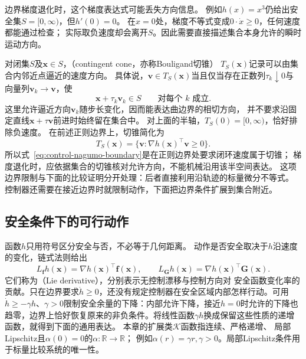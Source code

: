 边界梯度退化时，这个梯度表达式可能丢失方向信息。
例如$h(x)=x^3$仍给出安全集$S=[0,\infty)$，但$h'(0)=0$。
在$x=0$处，梯度不等式变成$0\cdot\dot x\geq0$，任何速度都能通过检查；
实际取负速度却会离开$S$。因此需要直接描述集合本身允许的瞬时运动方向。

对闭集$S$及$\bm x\in S$，（contingent cone，亦称Bouligand切锥）
$T_S(\bm x)$记录可以由集合内邻近点逼近的速度方向。
具体说，$\bm v\in T_S(\bm x)$当且仅当存在正数列$\tau_k\downarrow0$与
向量列$\bm v_k\to\bm v$，使
\[
  \bm x+\tau_k\bm v_k\in S\qquad\text{对每个 }k\text{ 成立}.
\]
这里允许逼近方向$\bm v_k$随步长变化，因而能表达曲边界的相切方向，
并不要求沿固定直线$\bm x+\tau\bm v$前进时始终留在集合中。
对上面的半轴，$T_S(0)=[0,\infty)$，恰好排除负速度。
在前述正则边界上，切锥简化为
\[
  T_S(\bm x)=\{\bm v:\nabla h(\bm x)^\top\bm v\geq0\}.
\]
所以式~\eqref{eq:control-nagumo-boundary}是在正则边界处要求闭环速度属于切锥；
梯度退化时，应依据集合的切锥核对允许方向，不能机械沿用该半空间表达。
这项边界限制与下面的比较证明分开处理：后者直接利用沿轨迹的标量微分不等式。
控制器还需要在接近边界时就限制动作，下面把边界条件扩展到集合附近。

\subsection{安全条件下的可行动作}
函数$h$只用符号区分安全与否，不必等于几何距离。
动作是否安全取决于$h$沿速度的变化，链式法则给出
\[
  L_{\bm f}h(\bm x)=\nabla h(\bm x)^\top\bm f(\bm x),
  \qquad
  L_{\bm G}h(\bm x)=\nabla h(\bm x)^\top\bm G(\bm x).
\]
它们称为（Lie derivative），分别表示无控制漂移与控制方向对
安全函数变化率的贡献。只在边界要求\(\dot h\geq0\)，还没有规定控制器在安全区域内部怎样行动。可用\(\dot h\geq-\gamma h\)、\(\gamma>0\)限制安全余量的下降：内部允许下降，接近\(h=0\)时允许的下降也趋零，边界上恰好恢复原来的非负条件。将线性函数\(\gamma h\)换成保留这些性质的递增函数，就得到下面的通用表达。
本章的扩展类$\mathcal K$函数指连续、严格递增、
局部Lipschitz且$\alpha(0)=0$的$\alpha:\mathbb R\to\mathbb R$；
例如$\alpha(r)=\gamma r,\gamma>0$。局部Lipschitz条件用于标量比较系统的唯一性。

